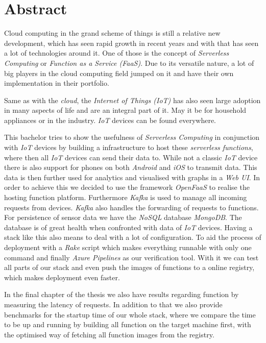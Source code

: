 \section*{Abstract}

Cloud computing in the grand scheme of things is still a relative new development, which has seen
rapid growth in recent years and with that has seen a lot of technologies around it. One of those is
the concept of \textit{Serverless Computing} or \textit{Function as a Service (FaaS)}. Due to its
versatile nature, a lot of big players in the cloud computing field jumped on it and have their own
implementation in their portfolio.

Same as with the \textit{cloud}, the \textit{Internet of Things (IoT)} has also seen large adoption
in many aspects of life and are an integral part of it. May it be for household appliances or in the
industry. \textit{IoT} devices can be found everywhere.

This bachelor tries to show the usefulness of \textit{Serverless Computing} in conjunction with
\textit{IoT} devices by building a infrastructure to host these \textit{serverless functions}, where
then all \textit{IoT} devices can send their data to. While not a classic \textit{IoT} device there
is also support for phones on both \textit{Android} and \textit{iOS} to transmit data. This data is
then further used for analytics and visualised with graphs in a \textit{Web UI}. In order to achieve
this we decided to use the framework \textit{OpenFaaS} to realise the hosting function platform.
Furthermore \textit{Kafka} is used to manage all incoming requests from devices. \textit{Kafka} also
handles the forwarding of requests to functions. For persistence of sensor data we have the
\textit{NoSQL} database \textit{MongoDB}. The database is of great health when confronted with data
of \textit{IoT} devices. Having a stack like this also means to deal with a lot of configuration. To
aid the process of deployment with a \textit{Rake} script which makes everything runnable with only
one command and finally \textit{Azure Pipelines} as our verification tool. With it we can test all
parts of our stack and even push the images of functions to a online registry, which makes
deployment even faster.

In the final chapter of the thesis we also have results regarding function by measuring the latency
of requests. In addition to that we also provide benchmarks for the startup time of our whole stack,
where we compare the time to be up and running by building all function on the target machine first,
with the optimised way of fetching all function images from the registry.
